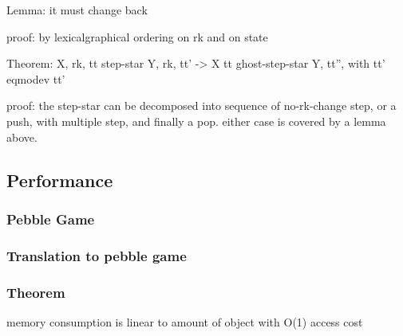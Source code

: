 Lemma: it must change back

proof: by lexicalgraphical ordering on rk and on state

Theorem: X, rk, tt step-star Y, rk, tt' -> X tt ghost-step-star Y, tt'', with tt' eqmodev tt'

proof: the step-star can be decomposed into sequence of no-rk-change step, or a push, with multiple step, and finally a pop. either case is covered by a lemma above.

\subsection{Performance}
\subsubsection{Pebble Game}
\subsubsection{Translation to pebble game}
\subsubsection{Theorem}
memory consumption is linear to amount of object with O(1) access cost
